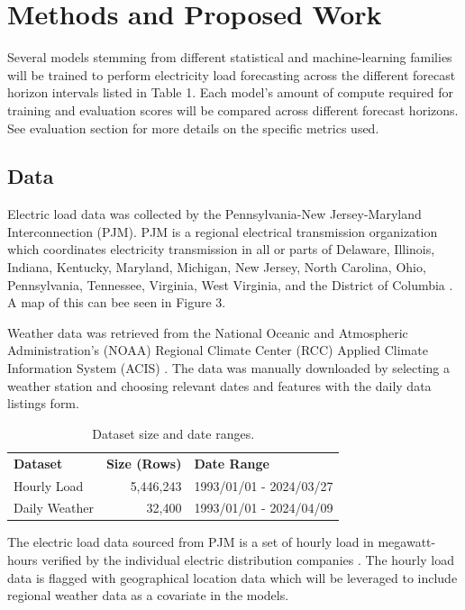 \documentclass[sigconf]{acmart}
\begin{document}
\section{Methods and Proposed Work}
Several models stemming from different statistical and machine-learning families will be trained to perform electricity load forecasting across the different forecast horizon intervals listed in Table 1. Each model's amount of compute required for training and evaluation scores will be compared across different forecast horizons. See evaluation section for more details on the specific metrics used.

  \subsection{Data}
  Electric load data was collected by the Pennsylvania-New Jersey-Maryland Interconnection (PJM). PJM is a regional electrical transmission organization which coordinates electricity transmission in all or parts of Delaware, Illinois, Indiana, Kentucky, Maryland, Michigan, New Jersey, North Carolina, Ohio, Pennsylvania, Tennessee, Virginia, West Virginia, and the District of Columbia \cite{PJMZone24}. A map of this can bee seen in Figure 3.
  
  Weather data was retrieved from the National Oceanic and Atmospheric Administration's (NOAA) Regional Climate Center (RCC) Applied Climate Information System (ACIS) \cite{ACIS}. The data was manually downloaded by selecting a weather station and choosing relevant dates and features with the daily data listings form. 
  
  \begin{table}[hbt!]
\centering
\caption{Dataset size and date ranges.}
\begin{tabular}{lrl}
\toprule
\textbf{Dataset} & \hfil \textbf{Size (Rows)} & \textbf{Date Range} \\
\cmidrule(rl){1-1}\cmidrule(rl){2-2}\cmidrule(rl){3-3}
  Hourly Load & 5,446,243 & 1993/01/01 - 2024/03/27 \\
  Daily Weather & 32,400 & 1993/01/01 - 2024/04/09  \\   
  \bottomrule
\end{tabular}
\end{table}
  
  The electric load data sourced from PJM is a set of hourly load in megawatt-hours verified by the individual electric distribution companies \cite{PJMLoad24}. The hourly load data is flagged with geographical location data which will be leveraged to include regional weather data as a covariate in the models. 
  
\end{document}
